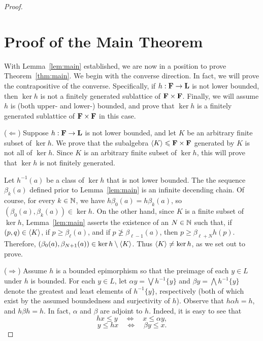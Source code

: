 \begin{proof}
\section{Proof of the Main Theorem}
With Lemma~\ref{lem:main} established, we are now in a position to prove 
Theorem~\ref{thm:main}.  We begin with the converse direction.  
In fact, we will prove the contrapositive of the converse.
Specifically, if $h: \mathbf{F} \to \mathbf{L}$ is not lower bounded,
then $\ker h$ is not a finitely generated sublattice of 
$\mathbf{F} \times \mathbf{F}$.  Finally,  we will assume $h$ is 
(both upper- and lower-) bounded, and prove that $\ker h$ is a 
finitely generated sublattice of $\mathbf{F} \times \mathbf{F}$ in this case. 

\medskip


  \noindent ($\Leftarrow$)
  Suppose $h: \mathbf{F} \to \mathbf{L}$ is not lower bounded, 
  and let $K$ be an arbitrary finite subset of $\ker h$.  We prove that the 
  subalgebra $\langle K\rangle\leqslant \mathbf{F} \times \mathbf{F}$ generated by $K$ is not 
  all of $\ker h$.
  Since $K$ is an arbitrary finite subset of $\ker h$, this will prove that 
  $\ker h$ is not finitely generated.

  Let $h^{-1}(a)$ be a class of $\ker h$ that is not lower bounded.
  The the sequence $\beta_k(a)$ defined prior to Lemma~\ref{lem:main}
  is an infinite decending chain.  Of course, for every $k\in \mathbb{N}$, 
  we have $h \beta_0(a) = h \beta_k(a)$, so 
  $(\beta_0(a), \beta_k(a)) \in \ker h$. 
  On the other hand, since $K$ is a finite subset of $\ker h$, 
  Lemma~\ref{lem:main} asserts the existence of 
  an $N\in \mathbb{N}$ such that, if $(p,q) \in \langle K\rangle$, if 
  $p\geq \beta_\ell(a)$, and if $p\ngeq \beta_{\ell-1}(a)$, then 
  $p\geq \beta_{\ell +N} h(p)$.
  Therefore, $(\beta_0(a), \beta_{N+1}(a)) \in \ker h \setminus \langle K\rangle$. 
  Thus $\langle K\rangle\neq \ker h$, as we set out to prove.


\medskip

  \noindent ($\Rightarrow$)
  Assume $h$ is a bounded epimorphism so that the preimage of each 
  $y\in L$ under $h$ is bounded.  For each $y\in L$, let 
  $\alpha y= \bigvee h^{-1}\{y\}$ and $\beta y = \bigwedge h^{-1}\{y\}$ 
  denote the greatest and least elements of $h^{-1}\{y\}$, respectively 
  (both of which exist by the assumed boundedness and surjectivity of $h$).  
  Observe that $h \alpha h = h$, and $h \beta h = h$. In fact, $\alpha$ 
  and $\beta$ are adjoint to $h$. Indeed, it is easy to see that
  \[
  h x \leqslant y \quad \Leftrightarrow \quad x \leqslant \alpha y,
  \]
  \[
  y \leqslant h x \quad \Leftrightarrow \quad \beta y \leqslant x.
  \]


\end{proof}
